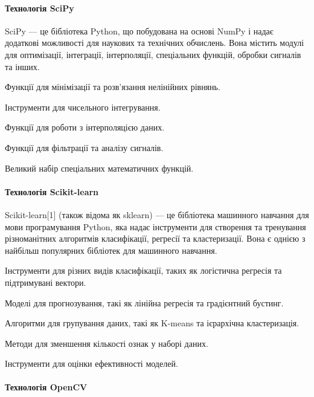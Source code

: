 \documentclass[oneside,14pt]{extarticle}
\begin{document}
\paragraph{Технологія SciPy}

SciPy — це бібліотека Python, що побудована на основі NumPy і надає додаткові можливості для наукових та технічних обчислень. Вона містить модулі для оптимізації, інтеграції, інтерполяції, спеціальних функцій, обробки сигналів та інших.

\begin{list}{-}{Основні можливості SciPy:}
	\item Функції для мінімізації та розв'язання нелінійних рівнянь.
	\item Інструменти для чисельного інтегрування.
	\item Функції для роботи з інтерполяцією даних.
	\item Функції для фільтрації та аналізу сигналів.
	\item Великий набір спеціальних математичних функцій.
\end{list}

\paragraph{Технологія Scikit-learn}

Scikit-learn[1] (також відома як sklearn) — це бібліотека машинного навчання для мови програмування Python, яка надає інструменти для створення та тренування різноманітних алгоритмів класифікації, регресії та кластеризації. Вона є однією з найбільш популярних бібліотек для машинного навчання.

\begin{list}{-}{Основні можливості Scikit-learn:}
	\item Інструменти для різних видів класифікації, таких як логістична регресія та підтримувані вектори.
	\item Моделі для прогнозування, такі як лінійна регресія та градієнтний бустинг.
	\item Алгоритми для групування даних, такі як K-means та ієрархічна кластеризація.
	\item Методи для зменшення кількості ознак у наборі даних.
	\item Інструменти для оцінки ефективності моделей.
\end{list}

\paragraph{Технологія OpenCV}
\end{document}
